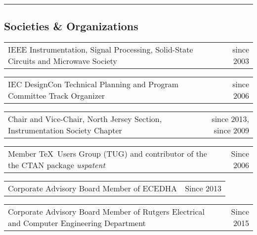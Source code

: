 \documentclass[10pt,letterpaper]{extarticle}
\makeatletter
\newcommand{\headerrow}[2]
{\begin{tabular*}{\linewidth}{l@{\extracolsep{\fill}}r}
	#1 &
	#2 \\
\end{tabular*}}
\makeatother
\begin{document}
\vspace{0.2em}
\hrule
\vspace{-1em}\subsection*{\Large Societies \& Organizations}\vspace{-0.5em}
\headerrow
		{IEEE Instrumentation, Signal Processing, Solid-State Circuits and Microwave Society}
		{since 2003}
\headerrow
		{IEC DesignCon Technical Planning and Program Committee Track Organizer}
		{since 2006}
\headerrow
		{Chair and Vice-Chair, North Jersey Section, Instrumentation Society Chapter}
		{since 2013, since 2009}
\headerrow
		{Member \TeX~Users Group (TUG) and contributor of the the CTAN package \emph{uspatent}}
		{Since 2006}
\headerrow
		{Corporate Advisory Board Member of ECEDHA}
		{Since 2013}
\headerrow
		{Corporate Advisory Board Member of Rutgers Electrical and Computer Engineering Department}
		{Since 2015}
\end{document}
